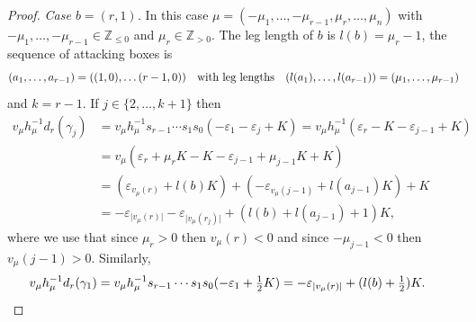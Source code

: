 \documentclass[11pt]{article}
\theoremstyle{plain}
\theoremstyle{definition}
\theoremstyle{remark}
\numberwithin{equation}{section}
\def\ZZ{\mathbb{Z}}
\newcounter{r}
\newcounter{s}
\begin{document}
\begin{proof}
\smallskip\noindent
\emph{Case $b=(r,1)$.}
In this case $\mu= (-\mu_1, \ldots, -\mu_{r-1}, \mu_r, \ldots, \mu_n)$ with $-\mu_1, \ldots, -\mu_{r-1}\in \ZZ_{\le 0}$ and $\mu_r\in \ZZ_{>0}$.
The leg length of $b$ is $l(b)=\mu_r-1$, the sequence of attacking boxes is 
$$(a_1, \ldots, a_{r-1}) = ((1,0), \ldots (r-1,0))\quad\hbox{with leg lengths}\quad
(l(a_1), \ldots, l(a_{r-1})) = (\mu_1, \ldots, \mu_{r-1})$$
and $k=r-1$.
If $j\in \{2, \ldots, k+1\}$ then
\begin{align*}
v_\mu h_\mu^{-1}d_r(\gamma_{j})
&= v_\mu h_\mu^{-1}s_{r-1}\cdots s_1 s_0(-\varepsilon_1-\varepsilon_j+K) 
= v_\mu h_\mu^{-1}(\varepsilon_r-K-\varepsilon_{j-1}+K) \\
&= v_\mu (\varepsilon_r+\mu_r K-K-\varepsilon_{j-1}+\mu_{j-1}K +K) \\
&= (\varepsilon_{v_{\mu}(r) } + l(b)K)
+(-\varepsilon_{v_{\mu}(j-1)} + l(a_{j-1}) K)
+ K \\
&= - \varepsilon_{\vert v_{\mu}(r)\vert } - \varepsilon_{\vert v_{\mu}(r_j)\vert } + (l(b) + l(a_{j-1}) + 1)K,
\end{align*}
where 
we use that since $\mu_r>0$ then $v_\mu(r)<0$ and since $-\mu_{j-1}<0$ then $v_\mu(j-1)>0$.
Similarly,
\begin{align*}
v_\mu h_\mu^{-1}d_r(\gamma_{1}) 
&= v_\mu h_\mu^{-1}s_{r-1}\cdots s_1 s_0 (-\varepsilon_1+\hbox{$\frac12$} K) 
= -\varepsilon_{\vert v_{\mu}(r)\vert } +(l(b) + \hbox{$\frac{1}{2})$}K.
\end{align*}


\end{proof}
\end{document}
